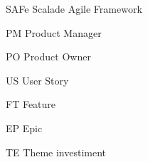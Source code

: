 \begin{siglas}
  \item[SAFe] Scalade Agile Framework
  \item[PM] Product Manager
  \item[PO] Product Owner
  \item[US] User Story
  \item[FT] Feature
  \item[EP] Epic
  \item[TE] Theme investiment
\end{siglas}
